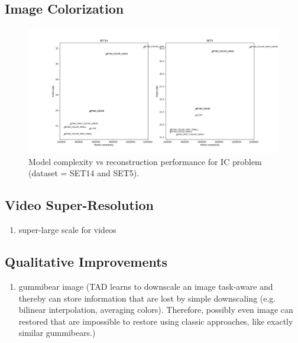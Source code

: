 \subsection{Image Colorization}
\label{sec:Experiments_IC}

\begin{figure}[!htbp]
	\centering
	\includegraphics[width=14cm]{figures/psnr_complexity_ic}
	\caption{Model complexity vs reconstruction performance for \ac{IC}
	problem (dataset = SET14 and SET5).}
  \label{fig:psnr_complexity_ic}
\end{figure}

\subsection{Video Super-Resolution}
\label{sec:Experiments_VSR}

\begin{enumerate}
\item super-large scale for videos
\end{enumerate}

\subsection{Qualitative Improvements}
\label{sec:Experiments_QI}



\begin{enumerate}
\item gummibear image (TAD learns to downscale an image task-aware and thereby
can store information that are lost by simple downscaling (e.g. bilinear
interpolation, averaging colors). Therefore, possibly even image can restored
that are impossible to restore  using classic approaches, like exactly
similar gummibears.)
\end{enumerate}

